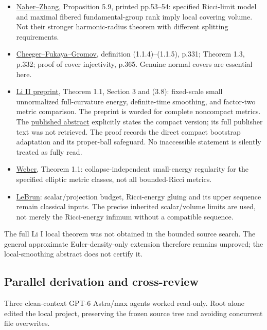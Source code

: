 \documentclass[
  10pt,
]{article}
\providecommand{\tightlist}{%
  \setlength{\itemsep}{0pt}\setlength{\parskip}{0pt}}
\begin{document}
\begin{itemize}
\tightlist
\item
  \href{https://arxiv.org/pdf/1412.1326}{Naber--Zhang}, Proposition 5.9,
  printed pp.53--54: specified Ricci-limit model and maximal fibered
  fundamental-group rank imply local covering volume. Not their stronger
  harmonic-radius theorem with different splitting requirements.
\item
  \href{https://www.ihes.fr/~gromov/wp-content/uploads/2018/08/384.pdf}{Cheeger--Fukaya--Gromov},
  definition (1.1.4)--(1.1.5), p.331; Theorem 1.3, p.332; proof of cover
  injectivity, p.365. Genuine normal covers are essential here.
\item
  \href{https://arxiv.org/pdf/0911.3104}{Li II preprint}, Theorem 1.1,
  Section 3 and (3.8): fixed-scale small unnormalized full-curvature
  energy, definite-time smoothing, and factor-two metric comparison. The
  preprint is worded for complete noncompact metrics. The
  \href{https://link.springer.com/article/10.1007/s10455-011-9290-0}{published
  abstract} explicitly states the compact version; its full publisher
  text was not retrieved. The proof records the direct compact bootstrap
  adaptation and its proper-ball safeguard. No inaccessible statement is
  silently treated as fully read.
\item
  \href{https://nyjm.albany.edu/j/2017/23-64p.pdf}{Weber}, Theorem 1.1:
  collapse-independent small-energy regularity for the specified
  elliptic metric classes, not all bounded-Ricci metrics.
\item
  \href{https://arxiv.org/abs/math/0003068}{LeBrun}: scalar/projection
  budget, Ricci-energy gluing and its upper sequence remain classical
  inputs. The precise inherited scalar/volume limits are used, not
  merely the Ricci-energy infimum without a compatible sequence.
\end{itemize}

The full Li I local theorem was not obtained in the bounded source
search. The general approximate Euler-density-only extension therefore
remains unproved; the local-smoothing abstract does not certify it.

\hypertarget{parallel-derivation-and-cross-review}{%
\subsection{Parallel derivation and
cross-review}\label{parallel-derivation-and-cross-review}}

Three clean-context GPT-6 Astra/max agents worked read-only. Root alone
edited the local project, preserving the frozen source tree and avoiding
concurrent file overwrites.
\end{document}
